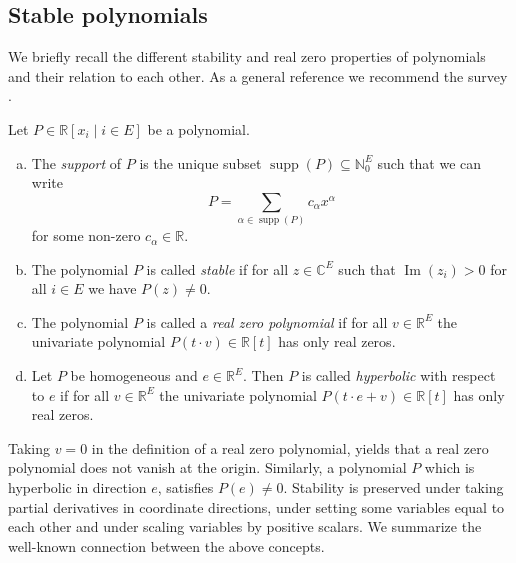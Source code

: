\documentclass[11pt]{article}
\theoremstyle{definition}
\numberwithin{equation}{section}
\newcommand{\N}{{\mathbb N}}
\newcommand{\R}{{\mathbb R}}
\newcommand{\C}{{\mathbb C}}
\newcommand{\supp}{\operatorname{supp}}
\newcommand{\Ima}{\operatorname{Im}}
\begin{document}
\subsection{Stable polynomials}
We briefly recall the different stability and real zero properties of polynomials and their relation to each other. As a general reference we recommend the survey \cite{pemantle}.
\begin{Def}
    Let $P\in\R[x_i\mid i\in E]$ be a polynomial.
    \begin{enumerate}[(a)]
        \item The \emph{support} of $P$ is the unique subset $\supp(P)\subseteq\N_0^E$ such that we can write
        \begin{equation*}
            P=\sum_{\alpha\in\supp(P)}c_\alpha x^\alpha
        \end{equation*}
        for some non-zero $c_\alpha\in\R$.
        \item The polynomial $P$ is called \emph{stable} if for all $z\in\C^E$ such that $\Ima(z_i)>0$ for all $i\in E$ we have $P(z)\neq0$.
        \item The polynomial $P$ is called a \emph{real zero polynomial} if for all $v\in\R^E$ the univariate polynomial $P(t\cdot v)\in\R[t]$ has only real zeros.
        \item Let $P$ be homogeneous and $e\in\R^E$. Then $P$ is called \emph{hyperbolic} with respect to $e$ if for all $v\in\R^E$ the univariate polynomial $P(t\cdot e+v)\in\R[t]$ has only real zeros.
    \end{enumerate}
\end{Def}

Taking $v=0$ in the definition of a real zero polynomial, yields that a real zero polynomial does not vanish at the origin. Similarly, a polynomial $P$ which is hyperbolic in direction $e$, satisfies $P(e)\neq0$. Stability is preserved under taking partial derivatives in coordinate directions, under setting some variables equal to each other and under scaling variables by positive scalars. We summarize the well-known connection between the above concepts.
\end{document}
